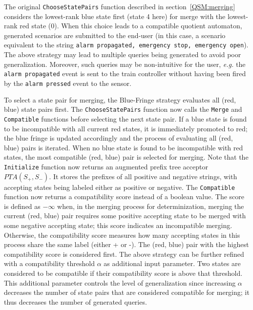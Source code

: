 The original \texttt{ChooseStatePairs} function described in section~\ref{QSM:merging} considers the lowest-rank blue state first (state 4 here) for merge with the lowest-rank red state (0). When this choice leads to a compatible quotient automaton, generated scenarios are submitted to the end-user (in this case, a scenario equivalent to the string \texttt{alarm propagated, emergency stop, emergency open}). The above strategy may lead to multiple queries being generated to avoid poor generalization. Moreover, such queries may be non-intuitive for the user, \textit{e.g.} the \texttt{alarm propagated} event is sent to the train controller without having been fired by the \texttt{alarm pressed} event to the sensor.

To select a state pair for merging, the Blue-Fringe strategy evaluates all (red, blue) state pairs first. The \texttt{ChooseStatePairs} function now calls the \texttt{Merge} and \texttt{Compatible} functions before selecting the next state pair. If a blue state is found to be incompatible with all current red states, it is immediately promoted to red; the blue fringe is updated accordingly and the process of evaluating all (red, blue) pairs is iterated. When no blue state is found to be incompatible with red states, the most compatible (red, blue) pair is selected for merging. Note that the \texttt{Initialize} function now returns an augmented prefix tree acceptor $PTA(S_+, S_-)$. It stores the prefixes of all positive and negative strings, with accepting states being labeled either as positive or negative. The \texttt{Compatible} function now returns a compatibility score instead of a boolean value. The score is defined as $-\infty$ when, in the merging process for determinization, merging the current (red, blue) pair requires some positive accepting state to be merged with some negative accepting state; this score indicates an incompatible merging. Otherwise, the compatibility score measures how many accepting states in this process share the same label (either + or -). The (red, blue) pair with the highest compatibility score is considered first.  The above strategy can be further refined with a compatibility threshold $\alpha$ as additional input parameter. Two states are considered to be compatible if their compatibility score is above that threshold. This additional parameter controls the level of generalization since increasing $\alpha$ decreases the number of state pairs that are considered compatible for merging; it thus decreases the number of generated queries.

